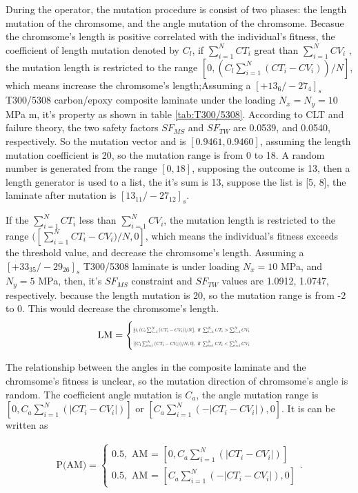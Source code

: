 
During the operator, the mutation procedure is consist of two phases: the length
mutation of the chromsome, and the angle mutation of the chromsome.  Becasue the
chromsome's length is positive correlated with the individual's fitness, the
coefficient of length mutation denoted by $C_l$, if $\sum_{i=1}^{N}{CT_i}$ great
than $\sum_{i=1}^{N}{CV_i}$ , the mutation length is restricted to the range
$[0,(C_l \sum_{i=1}^{N}{(CT_i-CV_i)})/N]$, which means increase the chromsome's
length;Assuming a $[+13_6/-27_4]_s$ T300/5308 carbon/epoxy composite
laminate under the loading $N_{x} = N_{y} = 10$ MPa m, it's property as shown
in table \ref{tab:T300/5308}. According to CLT and
failure theory, the two safety factors $SF_{MS}$ and $SF_{TW}$ are  0.0539, and
0.0540, respectively. So the mutation vector and is $[0.9461,0.9460]$, assuming
the length mutation coefficient is 20, so the mutation range is from 0 to 18. A
random number is generated from the range $[0, 18]$, supposing the outcome is
13, then a length generator is used to a list, the it's sum is 13, suppose the
list is [5, 8], the laminate after mutation is $[13_{11}/-27_{12}]_s$.

If the $\sum_{i=1}^{N}{CT_i}$ less than $\sum_{i=1}^{N}{CV_i}$, the
mutation length is restricted to the range $([\sum_{i=1}^{N}{CT_i-CV_i})/N,0]$,
which means the individual's fitness exceeds the threshold value, and decrease
the chromsome's length.  Assuming a $[+33_{35}/-29_{26}]_s$ T300/5308 laminate
is under loading $N_{x}=10$ MPa, and $N_{y}=5$ MPa, then, it's $SF_{MS}$
constraint and $SF_{TW}$ values are  1.0912, 1.0747, respectively.
because the length mutation is 20, so the mutation range is from -2 to 0. This
would decrease the chromsome's length. 
\begin{align}
	\text{LM} = 
	\begin{cases}
		\resizebox{.35\textwidth}{!}{$[0,(C_l \sum_{i=1}^{N}{(CT_i-CV_i)})/N], \text{ if }  \sum_{i=1}^{N}{CT_i} > 
		\sum_{i=1}^{N}{CV_i}$}\\
		\resizebox{.35\textwidth}{!}{$[(C_l \sum_{i=1}^{N}{(CT_i-CV_i)})/N,0], \text{ if }  \sum_{i=1}^{N}{CT_i} < 
		\sum_{i=1}^{N}{CV_i}$}\\
	\end{cases} 
\end{align}

The relationship between the angles in the composite laminate and the
chromsome's fitness is unclear, so the mutation direction of chromsome's angle
is random. The coefficient angle mutation is $C_a$, the angle mutation range is
$[0,C_a \sum_{i=1}^{N}{(|CT_i-CV_i|)}]$ or $[C_a
\sum_{i=1}^{N}{(-|CT_i-CV_i|)},0]$. It is can be written as

\begin{align}
	\text{P(AM)} =  
	\begin{cases}
		0.5, \text{ AM = }[0,C_a \sum_{i=1}^{N}{(|CT_i-CV_i|)}] \\ 
	    0.5, \text{ AM = }[C_a \sum_{i=1}^{N}{(-|CT_i-CV_i|)},0]
	\end{cases} \textstyle{.}
\end{align}
